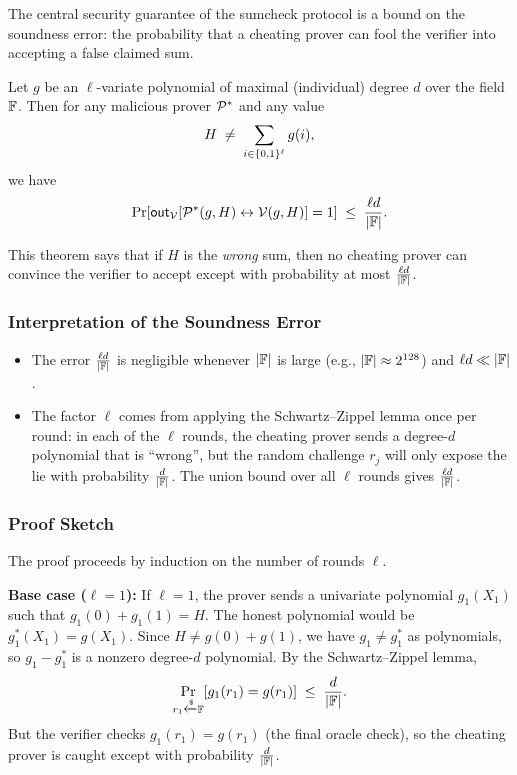 \documentclass[11pt]{article}
\begin{document}
The central security guarantee of the sumcheck protocol is a bound on the soundness error: the
probability that a cheating prover can fool the verifier into accepting a false claimed sum.

\begin{tcolorbox}[colback=yellow!10, colframe=orange!70!black, title={Theorem 1 (Soundness of Sumcheck)}]
  \begin{theorem}
    Let $g$ be an $\ell$-variate polynomial of maximal (individual) degree $d$ over the field $\mathbb{F}$.
    Then for any malicious prover $\mathcal{P}^*$ and any value
    \[
      H \;\neq\; \sum_{i \in \{0,1\}^\ell} g(i),
    \]
    we have
    \[
      \Pr\!\left[\mathsf{out}_{\mathcal{V}}\!\left[\mathcal{P}^*(g, H) \leftrightarrow \mathcal{V}(g, H)\right] = 1\right]
      \;\leq\; \frac{\ell d}{|\mathbb{F}|}.
    \]
  \end{theorem}
\end{tcolorbox}

\medskip
\noindent
This theorem says that if $H$ is the \emph{wrong} sum, then no cheating prover can convince the
verifier to accept except with probability at most $\frac{\ell d}{|\mathbb{F}|}$.

\subsubsection*{Interpretation of the Soundness Error}

\begin{itemize}
  \item The error $\frac{\ell d}{|\mathbb{F}|}$ is negligible whenever $|\mathbb{F}|$ is large (e.g., $|\mathbb{F}| \approx 2^{128}$)
        and $\ell d \ll |\mathbb{F}|$.
  \item The factor $\ell$ comes from applying the Schwartz--Zippel lemma once per round: in each
        of the $\ell$ rounds, the cheating prover sends a degree-$d$ polynomial that is ``wrong'',
        but the random challenge $r_j$ will only expose the lie with probability $\frac{d}{|\mathbb{F}|}$.
        The union bound over all $\ell$ rounds gives $\frac{\ell d}{|\mathbb{F}|}$.
\end{itemize}

\subsubsection*{Proof Sketch}

The proof proceeds by induction on the number of rounds $\ell$.

\textbf{Base case ($\ell = 1$):} If $\ell = 1$, the prover sends a univariate polynomial
$g_1(X_1)$ such that $g_1(0) + g_1(1) = H$. The honest polynomial would be $g_1^*(X_1) = g(X_1)$.
Since $H \neq g(0) + g(1)$, we have $g_1 \neq g_1^*$ as polynomials, so $g_1 - g_1^*$ is a
nonzero degree-$d$ polynomial. By the Schwartz--Zippel lemma,
\[
  \Pr_{r_1 \xleftarrow{\$} \mathbb{F}}\!\left[g_1(r_1) = g(r_1)\right] \;\leq\; \frac{d}{|\mathbb{F}|}.
\]
But the verifier checks $g_1(r_1) = g(r_1)$ (the final oracle check), so the cheating prover is
caught except with probability $\frac{d}{|\mathbb{F}|}$.
\end{document}
